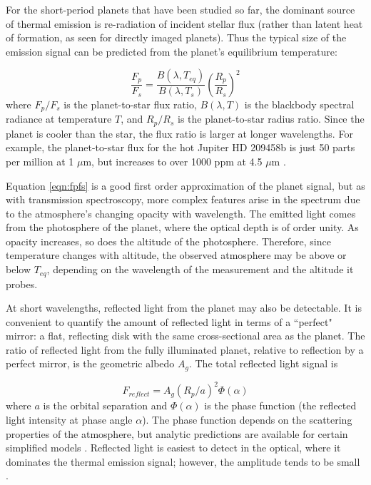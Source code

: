 \documentclass[graybox,natbib,nosecnum]{svmult}
\newcommand{\hbindex}[1]{\hl{#1}\index{#1}}  %
\begin{document}
For the short-period planets that have been studied so far, the dominant source of thermal emission is re-radiation of incident stellar flux (rather than latent heat of formation, as seen for directly imaged planets). Thus the typical size of the emission signal can be predicted from the planet's equilibrium temperature:

\begin{equation}
\label{eqn:fpfs}
\frac{F_p}{F_s} = \frac{B(\lambda, T_{eq})}{B(\lambda, T_s)}\left(\frac{R_p}{R_s}\right)^2
\end{equation}
where $F_p/F_s$ is the planet-to-star flux ratio, $B(\lambda, T)$ is the blackbody spectral radiance at temperature $T$, and $R_p/R_s$ is the planet-to-star radius ratio. Since the planet is cooler than the star, the flux ratio is larger at longer wavelengths. For example, the planet-to-star flux for the hot Jupiter HD 209458b is just 50 parts per million at 1 $\mu$m, but increases to over 1000 ppm at 4.5 $\mu$m \citep{line16}.

Equation \ref{eqn:fpfs} is a good first order approximation of the planet signal, but as with transmission spectroscopy, more complex features arise in the spectrum due to the atmosphere's changing opacity with wavelength. The emitted light comes from the photosphere of the planet, where the optical depth is of order unity.  As opacity increases, so does the altitude of the photosphere.  Therefore, since temperature changes with altitude, the observed atmosphere may be above or below $T_{eq}$, depending on the wavelength of the measurement and the altitude it probes. 


At short wavelengths, reflected light from the planet may also be detectable. It is convenient to quantify the amount of reflected light in terms of a ``perfect" mirror: a flat, reflecting disk with the same cross-sectional area as the planet. The ratio of reflected light from the fully illuminated planet, relative to reflection by a perfect mirror, is the geometric albedo $A_g$. The total reflected light signal is

\begin{equation}
F_{reflect} = A_g(R_p/a)^2 \Phi(\alpha)
\end{equation}
where $a$ is the orbital separation and $\Phi(\alpha)$ is the phase function (the reflected light intensity at phase angle $\alpha$). The phase function depends on the scattering properties of the atmosphere, but analytic predictions are available for certain simplified models \citep[e.g.][]{madhu12}.  Reflected light is easiest to detect in the optical, where it dominates the thermal emission signal; however, the amplitude tends to be small \citep[typically less than 100 ppm;][]{angerhausen15}.
\end{document}

